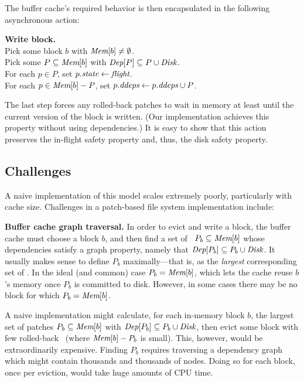 The buffer cache's required behavior is then encapsulated in the following
asynchronous action:

\begin{tabbing}
\textbf{Write block.} \\
\quad Pick some block $b$ with $\PMem[b] \neq \emptyset$. \\
\quad Pick some $P \subseteq \PMem[b]$ with $\PDepset{P} \subseteq P \cup
\PDisk$. \\
\quad For each $p \in P$, set $p.\textit{state} \gets \textit{flight}$. \\
\quad For each $p \in \PMem[b]-P$, set $\PDDepset{p} \gets \PDDepset{p}
\cup P$.
\end{tabbing}

\noindent
%
The last step forces any rolled-back patches to wait in memory at least
until the current version of the block is written.  (Our implementation
achieves this property without using dependencies.)
%
It is easy to show that this action preserves the in-flight safety property
and, thus, the disk safety property.


\subsection{Challenges}

A naive implementation of this model scales extremely poorly,
particularly with cache size.
%
Challenges in a patch-based file system implementation include:

\textbf{Buffer cache graph traversal.}
%
In order to evict and write a block, the buffer cache must choose a block
$b$,
%
and then find a set of \patches\ $P_b \subseteq \PMem[b]$ whose dependencies
satisfy a graph property, namely that $\PDepset{P_b} \subseteq P_b \cup
\PDisk$.
%
It usually makes sense to define $P_b$ maximally---that is, as the
\emph{largest} corresponding set of \patches.
%
In the ideal (and common) case $P_b = \PMem[b]$, which lets the cache reuse
$b$'s memory once $P_b$ is committed to disk.  However, in some cases there
may be no block for which $P_b = \PMem[b]$.

A naive implementation might calculate, for each in-memory block $b$, the
largest set of patches $P_b \subseteq \PMem[b]$ with $\PDepset{P_b}
\subseteq P_b \cup \PDisk$, then evict some block with few rolled-back
\patches\ (where $\PMem[b] - P_b$ is small).
%
This, however, would be extraordinarily expensive.
%
Finding $P_b$ requires traversing a dependency graph which might contain
thousands and thousands of nodes.
%
Doing so for each block, once per eviction, would take huge amounts of CPU
time.


